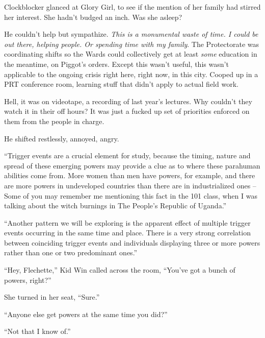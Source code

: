 Clockblocker glanced at Glory Girl, to see if the mention of her family had stirred her interest.  She hadn't budged an inch.  Was she asleep?



He couldn't help but sympathize. \emph{ This is a monumental waste of time.  I could be out there, helping people.  Or spending time with my family}.  The Protectorate was coordinating shifts so the Wards could collectively get at least \emph{some} education in the meantime, on Piggot's orders.  Except this wasn't useful, this wasn't applicable to the ongoing crisis right here, right now, in this city.  Cooped up in a PRT conference room, learning stuff that didn't apply to actual field work.



Hell, it was on videotape, a recording of last year's lectures.  Why couldn't they watch it in their off hours?  It was just a fucked up set of priorities enforced on them from the people in charge.



He shifted restlessly, annoyed, angry.



``Trigger events are a crucial element for study, because the timing, nature and spread of these emerging powers may provide a clue as to where these parahuman abilities come from.  More women than men have powers, for example, and there are more powers in undeveloped countries than there are in industrialized ones – Some of you may remember me mentioning this fact in the 101 class, when I was talking about the witch burnings in The People's Republic of Uganda.''



``Another pattern we will be exploring is the apparent effect of multiple trigger events occurring in the same time and place.  There is a very strong correlation between coinciding trigger events and individuals displaying three or more powers rather than one or two predominant ones.''



``Hey, Flechette,'' Kid Win called across the room, ``You've got a bunch of powers, right?''



She turned in her seat, ``Sure.''



``Anyone else get powers at the same time you did?''



``Not that I know of.''



